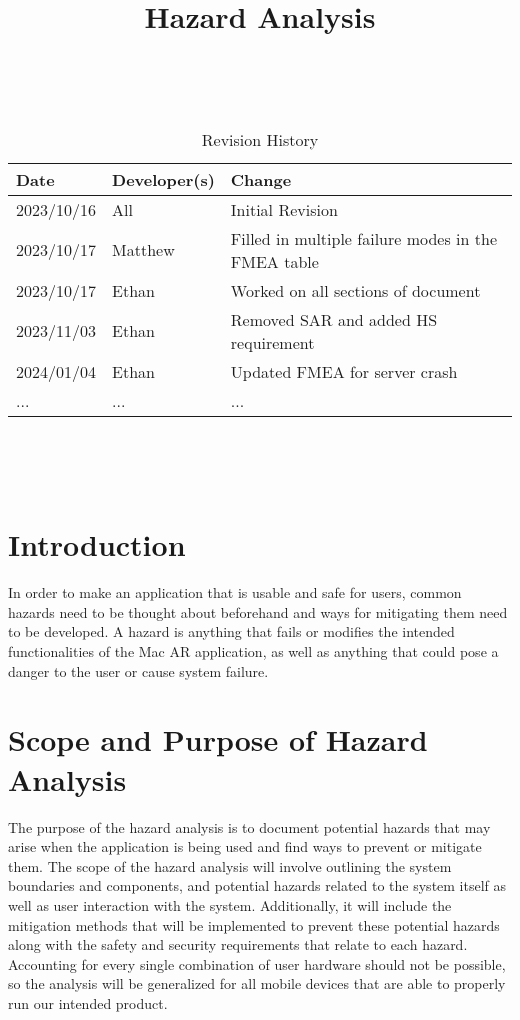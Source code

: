 \documentclass{article}
\title{Hazard Analysis\\\progname}
\author{\authname}
\date{}
\begin{document}
\maketitle
\thispagestyle{empty}

~\newpage


\begin{table}[hp]
\caption{Revision History} \label{TblRevisionHistory}
\begin{tabularx}{\textwidth}{llX}
\toprule
\textbf{Date} & \textbf{Developer(s)} & \textbf{Change}\\
\midrule
2023/10/16 & All & Initial Revision\\
2023/10/17 & Matthew & Filled in multiple failure modes in the FMEA table \\
2023/10/17 & Ethan & Worked on all sections of document \\
2023/11/03 & Ethan & Removed SAR and added HS requirement \\
2024/01/04 & Ethan & Updated FMEA for server crash\\
... & ... & ...\\
\bottomrule
\end{tabularx}
\end{table}

~\newpage

\tableofcontents

~\newpage



\section{Introduction}


In order to make an application that is usable and safe for users, common hazards need to be thought about beforehand and ways for mitigating them need to be developed. A hazard is anything that fails or modifies the intended functionalities of the Mac AR application, as well as anything that could pose a danger to the user or cause system failure.

\section{Scope and Purpose of Hazard Analysis}
The purpose of the hazard analysis is to document potential hazards that may arise when the application is being used and find ways to prevent or mitigate them. The scope of the hazard analysis will involve outlining the system boundaries and components, and potential hazards related to the system itself as well as user interaction with the system. Additionally, it will include the mitigation methods that will be implemented to prevent these potential hazards along with the safety and security requirements that relate to each hazard. Accounting for every single combination of user hardware should not be possible, so the analysis will be generalized for all mobile devices that are able to properly run our intended product.
\end{document}
